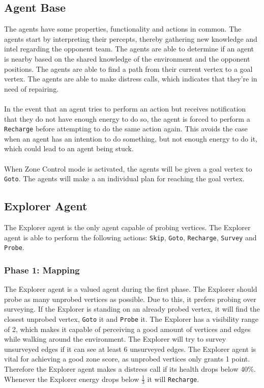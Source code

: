 \documentclass[11pt]{article}
\begin{document}
\subsection{Agent Base}
The agents have some properties, functionality and actions in common. The agents start by interpreting their percepts, thereby gathering new knowledge and intel regarding the opponent team. The agents are able to determine if an agent is nearby based on the shared knowledge of the environment and the opponent positions. The agents are able to find a path from their current vertex to a goal vertex. The agents are able to make distress calls, which indicates that they're in need of repairing.\\
\\
In the event that an agent tries to perform an action but receives notification that they do not have enough energy to do so, the agent is forced to perform a {\tt Recharge} before attempting to do the same action again. This avoids the case when an agent has an intention to do something, but not enough energy to do it, which could lead to an agent being stuck.\\
\\
When Zone Control mode is activated, the agents will be given a goal vertex to {\tt Goto}. The agents will make a an individual plan for reaching the goal vertex.

\subsection{Explorer Agent}
The Explorer agent is the only agent capable of probing vertices. The Explorer agent is able to perform the following actions: {\tt Skip}, {\tt Goto}, {\tt Recharge}, {\tt Survey} and {\tt Probe}.

\subsubsection*{Phase 1: Mapping}
The Explorer agent is a valued agent during the first phase. The Explorer should probe as many unprobed vertices as possible. Due to this, it prefers probing over surveying. If the Explorer is standing on an already probed vertex, it will find the closest unprobed vertex, {\tt Goto} it and {\tt Probe} it. The Explorer has a visibility range of 2, which makes it capable of perceiving a good amount of vertices and edges while walking around the environment. The Explorer will try to survey unsurveyed edges if it can see at least 6 unsurveyed edges. The Explorer agent is vital for achieving a good zone score, as unprobed vertices only grants 1 point. Therefore the Explorer agent makes a distress call if its health drops below 40\%. Whenever the Explorer energy drops below $\frac{1}{3}$ it will {\tt Recharge}.
\end{document}

